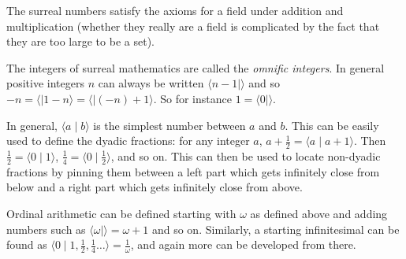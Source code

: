 \documentclass[12pt]{article}
\begin{document}
The surreal numbers satisfy the axioms for a field under addition and multiplication (whether they really are a field is complicated by the fact that they are too large to be a set).

The integers of surreal mathematics are called the \emph{omnific integers}.  In general positive integers $n$ can always be written $\langle n-1\mid\rangle$ and so $-n=\langle \mid 1-n\rangle=\langle \mid (-n)+1\rangle$.  So for instance $1=\langle 0\mid\rangle$.

In general, $\langle a\mid b\rangle$ is the simplest number between $a$ and $b$.  This can be easily used to define the dyadic fractions: for any integer $a$, $a+\frac{1}{2}=\langle a\mid a+1\rangle$.  Then $\frac{1}{2}=\langle 0\mid 1\rangle$, $\frac{1}{4}=\langle 0\mid \frac{1}{2}\rangle$, and so on.  This can then be used to locate non-dyadic fractions by pinning them between a left part which gets infinitely close from below and a right part which gets infinitely close from above.

Ordinal arithmetic can be defined starting with $\omega$ as defined above and adding numbers such as $\langle \omega\mid\rangle=\omega+1$ and so on.  Similarly, a starting infinitesimal can be found as $\langle 0\mid 1,\frac{1}{2},\frac{1}{4}\ldots\rangle=\frac{1}{\omega}$, and again more can be developed from there.
\end{document}
